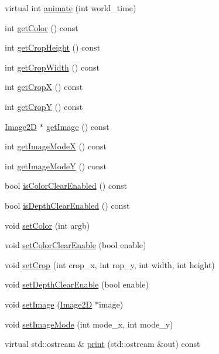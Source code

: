 \begin{CompactItemize}
\item 
virtual int \hyperlink{classm3g_1_1Background_8aad1ceab4c2a03609c8a42324ce484d}{animate} (int world\_\-time)
\item 
int \hyperlink{classm3g_1_1Background_4cfa1931c265ec3412fe3f6408a1b4f5}{getColor} () const 
\item 
int \hyperlink{classm3g_1_1Background_d6d9d6f23b7bb004c93642bcd081f4a3}{getCropHeight} () const 
\item 
int \hyperlink{classm3g_1_1Background_5c6515f6706675ef31ca5dfa0a03b953}{getCropWidth} () const 
\item 
int \hyperlink{classm3g_1_1Background_d0ba0211183decc8f0459ca598b12912}{getCropX} () const 
\item 
int \hyperlink{classm3g_1_1Background_9ef03b219415a1f08aef6745ad5d87d0}{getCropY} () const 
\item 
\hyperlink{classm3g_1_1Image2D}{Image2D} $\ast$ \hyperlink{classm3g_1_1Background_a8c0193b0e7d47d4b5c9f60df24c44f5}{getImage} () const 
\item 
int \hyperlink{classm3g_1_1Background_0dd60d498f4d50d8808c0b3ad61bc9e8}{getImageModeX} () const 
\item 
int \hyperlink{classm3g_1_1Background_a8d38d66f133ae417956a5dc5f84551d}{getImageModeY} () const 
\item 
bool \hyperlink{classm3g_1_1Background_d6b7bfdf4225b509549e2fbb9575b509}{isColorClearEnabled} () const 
\item 
bool \hyperlink{classm3g_1_1Background_d20a03183cd1c6418dcadf94ac0ca470}{isDepthClearEnabled} () const 
\item 
void \hyperlink{classm3g_1_1Background_38439e862c59a31b90e57c18669061ae}{setColor} (int argb)
\item 
void \hyperlink{classm3g_1_1Background_68e4fe4cf32fe60f166056115081aa65}{setColorClearEnable} (bool enable)
\item 
void \hyperlink{classm3g_1_1Background_e543ac6196bbe65a7af8e6b8686441a7}{setCrop} (int crop\_\-x, int rop\_\-y, int width, int height)
\item 
void \hyperlink{classm3g_1_1Background_0953a713c22fd40cd586bcd8af80075a}{setDepthClearEnable} (bool enable)
\item 
void \hyperlink{classm3g_1_1Background_705b89b41cd1b38f664ed912be44baaa}{setImage} (\hyperlink{classm3g_1_1Image2D}{Image2D} $\ast$image)
\item 
void \hyperlink{classm3g_1_1Background_aba37cb460a2376f1a4722eebb4de9a9}{setImageMode} (int mode\_\-x, int mode\_\-y)
\item 
virtual std::ostream \& \hyperlink{classm3g_1_1Background_6fea17fa1532df3794f8cb39cb4f911f}{print} (std::ostream \&out) const 
\end{CompactItemize}
